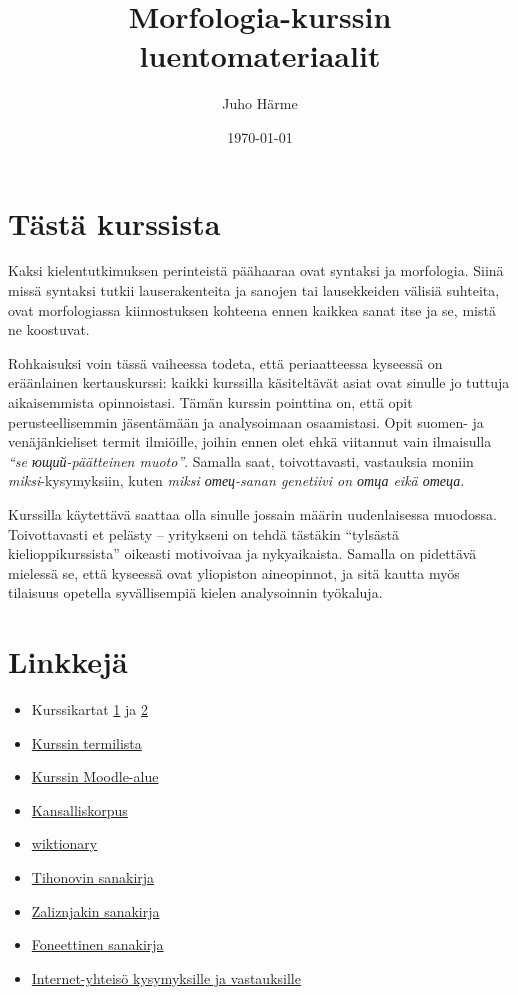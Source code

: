 \documentclass[]{scrreprt}
\author{Juho Härme}
\title{Morfologia-kurssin luentomateriaalit}
\date{\today}
\providecommand{\tightlist}{%
  \setlength{\itemsep}{0pt}\setlength{\parskip}{0pt}}
\begin{document}
\maketitle
\tableofcontents
\newpage



\chapter*{Tästä kurssista}\label{tuxe4stuxe4-kurssista}

Kaksi kielentutkimuksen perinteistä päähaaraa ovat syntaksi ja
morfologia. Siinä missä syntaksi tutkii lauserakenteita ja sanojen tai
lausekkeiden välisiä suhteita, ovat morfologiassa kiinnostuksen kohteena
ennen kaikkea sanat itse ja se, mistä ne koostuvat.

Rohkaisuksi voin tässä vaiheessa todeta, että periaatteessa kyseessä on
eräänlainen kertauskurssi: kaikki kurssilla käsiteltävät asiat ovat
sinulle jo tuttuja aikaisemmista opinnoistasi. Tämän kurssin pointtina
on, että opit perusteellisemmin jäsentämään ja analysoimaan osaamistasi.
Opit suomen- ja venäjänkieliset termit ilmiöille, joihin ennen olet ehkä
viitannut vain ilmaisulla \emph{``se ющий-päätteinen muoto''}. Samalla
saat, toivottavasti, vastauksia moniin \emph{miksi}-kysymyksiin, kuten
\emph{miksi отец-sanan genetiivi on отца eikä отеца}.

Kurssilla käytettävä saattaa olla sinulle jossain määrin uudenlaisessa
muodossa. Toivottavasti et pelästy -- yritykseni on tehdä tästäkin
``tylsästä kielioppikurssista'' oikeasti motivoivaa ja nykyaikaista.
Samalla on pidettävä mielessä se, että kyseessä ovat yliopiston
aineopinnot, ja sitä kautta myös tilaisuus opetella syvällisempiä kielen
analysoinnin työkaluja.

\chapter*{Linkkejä}\label{linkkejuxe4}

\begin{itemize}
\tightlist
\item
  Kurssikartat
  \href{https://mustikka.uta.fi/~juho_harme/morfologia/materiaalit/kurssikartta1.pdf}{1}
  ja
  \href{https://mustikka.uta.fi/~juho_harme/morfologia/materiaalit/kurssikartta2.pdf}{2}
\item
  \href{termit.html}{Kurssin termilista}
\item
  \href{https://learning2.uta.fi/course/view.php?id=8679}{Kurssin
  Moodle-alue}
\item
  \href{http://www.ruscorpora.ru}{Kansalliskorpus}
\item
  \href{http://ru.wiktionary.org}{wiktionary}
\item
  \href{http://http://old.kpfu.ru/infres/slovar1}{Tihonovin sanakirja}
\item
  \href{http://morfologija.ru}{Zaliznjakin sanakirja}
\item
  \href{http://slovonline.ru/slovar_el_fonetic/}{Foneettinen sanakirja}
\item
  \href{http://rus.stackexchange.com/}{Internet-yhteisö kysymyksille ja
  vastauksille}
\end{itemize}
\end{document}
